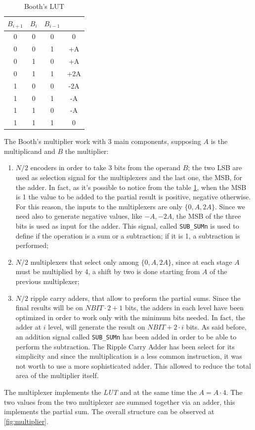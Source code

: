 \begin{table}[H]
	\begin{center}
		\begin{tabular}{ c c c | c}
			$B_{i+1}$ & $B_{i}$ & $B_{i-1}$ & \\
			\hline 
			0 & 0 & 0 & 0\\ 
			0 & 0 & 1 & +A\\ 
			0 & 1 & 0 & +A\\ 
			0 & 1 & 1 & +2A\\ 
			1 & 0 & 0 & -2A\\ 
			1 & 0 & 1 & -A\\ 
			1 & 1 & 0 & -A\\ 
			1 & 1 & 1 & 0\\ 
		\end{tabular}
		\caption{Booth's LUT}
		\label{mult:lut}
	\end{center}
\end{table}

The Booth's multiplier work with 3 main components, supposing $A$ is the multiplicand and $B$ the multiplier:
\begin{enumerate}
	\item $N/2$ encoders in order to take 3 bits from the operand $B$; the two LSB are used as selection signal for the multiplexers and the last one, the MSB, for the adder. In fact, as it's possible to notice from the table \ref{mult:lut}, when the MSB is 1 the value to be added to the partial result is positive, negative otherwise. For this reason, the inputs to the multiplexers are only $\{0, A, 2A\}$. Since we need also to generate negative values, like ${-A, -2A}$, the MSB of the three bits is used as input for the adder. This signal, called \texttt{SUB\_SUMn} is used to define if the operation is a sum or a subtraction; if it is 1, a subtraction is performed;
	\item $N/2$ multiplexers that select only among $\{0, A, 2A\}$, since at each stage $A$ must be multiplied by 4, a shift by two is done starting from $A$ of the previous multiplexer;
	\item $N/2$ ripple carry adders, that allow to preform the partial sums. Since the final results will be on $NBIT \cdot 2+1$ bits, the adders in each level have been optimized in order to work only with the minimum bits needed. In fact, the adder at $i$ level, will generate the result on $NBIT + 2 \cdot i$ bits. As said before, an addition signal called \texttt{SUB\_SUMn} has been added in order to be able to perform the subtraction. The Ripple Carry Adder has been select for its simplicity and since the multiplication is a less common instruction, it was not worth to use a more sophisticated adder. This allowed to reduce the total area of the multiplier itself.
\end{enumerate}
The multiplexer implements the \textit{LUT} and at the same time the $A = A \cdot 4$. The two values from the two multiplexer are summed together via an adder, this implements the partial sum. The overall structure can be observed at \ref{fig:multiplier}.

